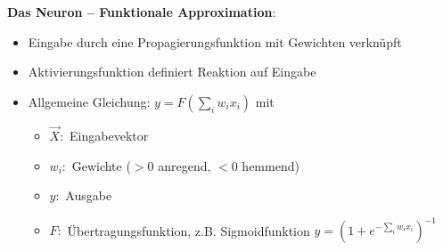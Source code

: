 \textbf{Das Neuron -- Funktionale Approximation}:
\begin{itemize}
\item Eingabe durch eine Propagierungsfunktion mit Gewichten verknüpft
\item Aktivierungsfunktion definiert Reaktion auf Eingabe
\item Allgemeine Gleichung: $y = F(\sum\limits_{i} w_ix_i)$ mit
\begin{itemize}
\item $\vec{X}:$ Eingabevektor
\item $w_i:$ Gewichte ($> 0$ anregend, $< 0$ hemmend)
\item $y:$ Ausgabe
\item $F:$ Übertragungsfunktion, z.B. Sigmoidfunktion $y = \left(1 + e^{- \sum\limits_{i} w_ix_i}\right)^{-1}$
\end{itemize}
\end{itemize}
